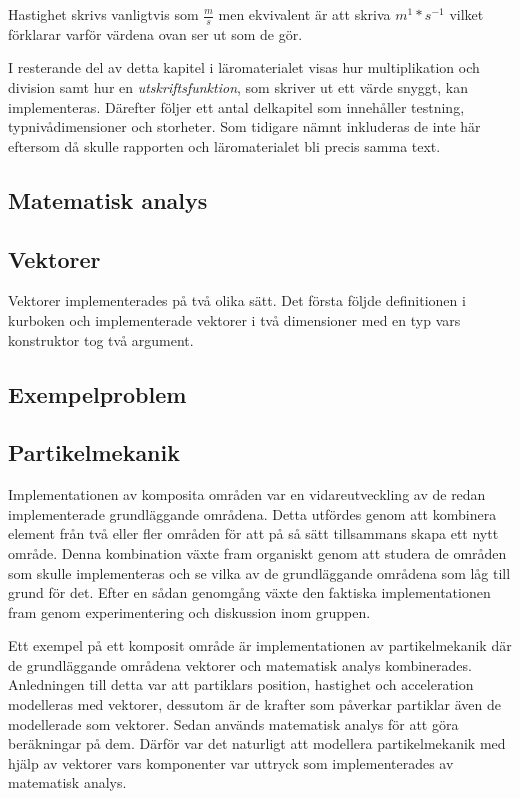 Hastighet skrivs vanligtvis som $\frac{m}{s}$ men ekvivalent är att skriva
$m^1*s^{-1}$ vilket förklarar varför värdena ovan ser ut som de gör.

I resterande del av detta kapitel i läromaterialet visas hur multiplikation och
division samt hur en \textit{utskriftsfunktion}, som skriver ut ett värde
snyggt, kan implementeras. Därefter följer ett antal delkapitel som innehåller
testning, typnivådimensioner och storheter. Som tidigare nämnt inkluderas de
inte här eftersom då skulle rapporten och läromaterialet bli precis samma text.

\subsection{Matematisk analys}

\subsection{Vektorer}

Vektorer implementerades på två olika sätt. Det första följde definitionen i
kurboken och implementerade vektorer i två dimensioner med en typ vars
konstruktor tog två argument.

\subsection{Exempelproblem}

\subsection{Partikelmekanik}

Implementationen av komposita områden var en vidareutveckling av de redan
implementerade grundläggande områdena. Detta utfördes genom att kombinera
element från två eller fler områden för att på så sätt tillsammans skapa ett
nytt område. Denna kombination växte fram organiskt genom att studera de områden
som skulle implementeras och se vilka av de grundläggande områdena som
låg till grund för det. Efter en sådan genomgång växte den faktiska
implementationen fram genom experimentering och diskussion inom gruppen.

Ett exempel på ett komposit område är implementationen av partikelmekanik
där de grundläggande områdena vektorer och matematisk analys
kombinerades. Anledningen till detta var att partiklars position, hastighet och
acceleration modelleras med vektorer, dessutom är de krafter som påverkar
partiklar även de modellerade som vektorer. Sedan används matematisk analys för
att göra beräkningar på dem. Därför var det naturligt att modellera
partikelmekanik med hjälp av vektorer vars komponenter var uttryck som
implementerades av matematisk analys.

